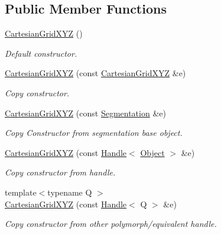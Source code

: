 \subsection*{Public Member Functions}
\begin{DoxyCompactItemize}
\item 
\hyperlink{class_d_d4hep_1_1_geometry_1_1_cartesian_grid_x_y_z_a69b3b30ca60751b1278fc3a8defc0384}{CartesianGridXYZ} ()
\begin{DoxyCompactList}\small\item\em Default constructor. \item\end{DoxyCompactList}\item 
\hyperlink{class_d_d4hep_1_1_geometry_1_1_cartesian_grid_x_y_z_a1ee0b706bcec6bec756fe48f89bd8797}{CartesianGridXYZ} (const \hyperlink{class_d_d4hep_1_1_geometry_1_1_cartesian_grid_x_y_z}{CartesianGridXYZ} \&e)
\begin{DoxyCompactList}\small\item\em Copy constructor. \item\end{DoxyCompactList}\item 
\hyperlink{class_d_d4hep_1_1_geometry_1_1_cartesian_grid_x_y_z_ad82c02f00f16d9849f2cef9f622ac691}{CartesianGridXYZ} (const \hyperlink{class_d_d4hep_1_1_geometry_1_1_segmentation}{Segmentation} \&e)
\begin{DoxyCompactList}\small\item\em Copy Constructor from segmentation base object. \item\end{DoxyCompactList}\item 
\hyperlink{class_d_d4hep_1_1_geometry_1_1_cartesian_grid_x_y_z_a81acd66a472e7cea44351a2120ef789a}{CartesianGridXYZ} (const \hyperlink{class_d_d4hep_1_1_handle}{Handle}$<$ \hyperlink{class_t}{Object} $>$ \&e)
\begin{DoxyCompactList}\small\item\em Copy constructor from handle. \item\end{DoxyCompactList}\item 
{\footnotesize template$<$typename Q $>$ }\\\hyperlink{class_d_d4hep_1_1_geometry_1_1_cartesian_grid_x_y_z_a99cfd639255681ac6773d137bb738ff4}{CartesianGridXYZ} (const \hyperlink{class_d_d4hep_1_1_handle}{Handle}$<$ Q $>$ \&e)
\begin{DoxyCompactList}\small\item\em Copy constructor from other polymorph/equivalent handle. \item\end{DoxyCompactList}\item 

\end{DoxyCompactItemize}

